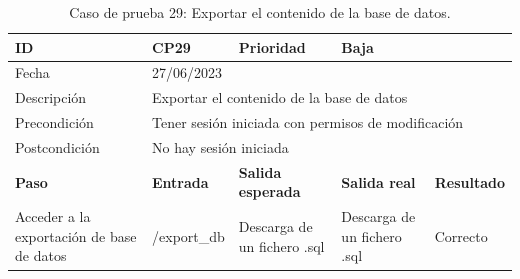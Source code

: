 \begin{table}[H]
\begin{tabular}{p{} p{} p{} p{} p{}}
\cellcolor{gray!25}
ID   & CP29 & \cellcolor{gray!25} Prioridad   & Baja \\ \hline
\cellcolor{gray!25} Fecha	&	\multicolumn{4}{l}{27/06/2023} \\ \hline
\cellcolor{gray!25} Descripción		&	\multicolumn{4}{l}{Exportar el contenido de la base de datos} \\ \hline                                            
\cellcolor{gray!25}
Precondición  & \multicolumn{4}{p{.66\textwidth}}{Tener sesión iniciada con permisos de modificación} \\ \hline
\cellcolor{gray!25} Postcondición & \multicolumn{4}{l}{No hay sesión iniciada}                                                    \\ \hline
\rowcolor{gray!25}
\textbf{Paso}   & \textbf{Entrada} & \textbf{Salida esperada} & \textbf{Salida real} & \textbf{Resultado} \\ \hline
Acceder a la exportación de base de datos
& /export\_db                                                                          
& Descarga de un fichero .sql                               
& Descarga de un fichero .sql                            
& Correcto                            
\\ \hline
\end{tabular}
\caption{Caso de prueba 29: Exportar el contenido de la base de datos.}
\end{table}

